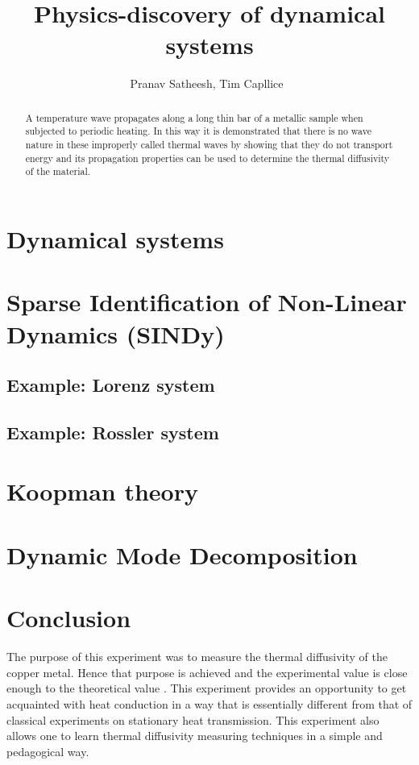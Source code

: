 \documentclass[12pt,a4]{article}
\begin{document}
\title{Physics-discovery of dynamical systems}


\author{Pranav Satheesh, Tim Capllice\
\small }
\maketitle


\begin{abstract}
A temperature wave propagates along a long thin bar of a metallic sample when subjected to periodic heating. In this way it is demonstrated that there is no wave nature in these improperly called thermal waves by showing that they do not transport energy and its propagation properties can be used to determine the thermal diffusivity of the material.
\end{abstract}

\section{Dynamical systems}

\section{Sparse Identification of Non-Linear Dynamics (SINDy)}


\subsection{Example: Lorenz system}

\subsection{Example: Rossler system}


\section{Koopman theory}

\section{Dynamic Mode Decomposition}



\section{Conclusion}
The purpose of this experiment was to measure the thermal diffusivity of the copper metal. Hence that purpose is achieved and the experimental value is close enough to the theoretical value \cite{4}. This experiment provides an opportunity to get acquainted with heat conduction in a way that is essentially different from that of classical experiments on stationary heat transmission. This experiment also allows one to learn thermal diffusivity measuring techniques in a simple and pedagogical way.
\end{document}

